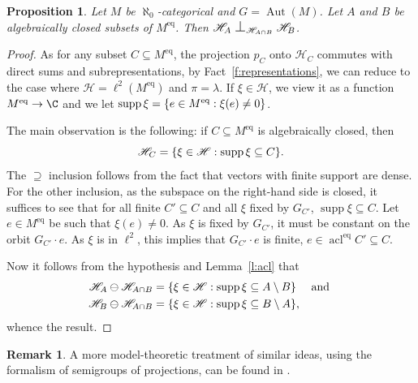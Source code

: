 \documentclass[JEP,XML,SOM,Unicode,published]{cedram}
\let\mathcal\mathscr
\let\sub\subseteq
\theoremstyle{plain}
\newtheorem{prop}[theorem]{Proposition}
\theoremstyle{definition}
\newtheorem{remark}[theorem]{Remark}
\newcommand{\cH}{\mathcal{H}}
\DeclareMathOperator{\acl}{acl}
\DeclareMathOperator{\Aut}{Aut}
\DeclareMathOperator{\supp}{supp}
\DeclarePairedDelimiter\set{\{}{\}}
\newcommand{\eq}{^{\mathrm{eq}}}
\renewcommand{\And}{\text{ and }}
\newcommand{\Perp}[1][]{\mathrel{
\mathop{
\scalebox{1.3}{\text{$\perp$}}
}\displaylimits_{#1}}}
\begin{document}
\begin{prop}
\label{p:repr-independent}
Let $M$ be $\aleph_0$-categorical and $G = \Aut(M)$. Let $A$ and $B$ be algebraically closed subsets of $M\eq$. Then $\cH_{A} \Perp[\cH_{A \cap B}] \cH_{B}$.
\end{prop}
\begin{proof}
As for any subset $C \sub M\eq$, the projection $p_C$ onto $\cH_C$ commutes with
direct sums and subrepresentations, by Fact~\ref{f:representations}, we can reduce to the case where $\cH = \ell^2(M\eq)$ and $\pi = \lambda$. If $\xi \in \cH$, we view it as a function $M\eq \to \C$ and we let $\supp \xi = \set{e \in M\eq : \xi(e) \neq 0}$.

The main observation is the following: if $C \sub M\eq$ is algebraically closed, then
\begin{equation*}
\cH_C = \set{\xi \in \cH : \supp \xi \sub C }.
\end{equation*}
The $\supseteq$ inclusion follows from the fact that vectors with finite support are dense. For the other inclusion, as the subspace on the right-hand side is closed, it suffices to see that for all finite $C' \sub C$ and all $\xi$ fixed by $G_{C'}$, $\supp \xi \sub C$. Let $e \in M\eq$ be such that $\xi(e) \neq 0$. As $\xi$ is fixed by $G_{C'}$, it must be constant on the orbit $G_{C'} \cdot e$. As $\xi$ is in $\ell^2$, this implies that $G_{C'} \cdot e$ is finite, \ie $e \in \acl\eq C' \sub C$.

Now it follows from the hypothesis and Lemma~\ref{l:acl} that
\begin{align*}
\cH_A \ominus \cH_{A \cap B} &= \set{\xi \in \cH : \supp \xi \sub A \setminus B} \quad \And \\
\cH_B \ominus \cH_{A \cap B} &= \set{\xi \in \cH : \supp \xi \sub B \setminus A},
\end{align*}
whence the result.
\end{proof}
\begin{remark}
\label{rem:mt-approach}
A more model-theoretic treatment of similar ideas, using the formalism of semigroups of projections, can be found in \cite{BenYaacov2018}.
\end{remark}
\end{document}
